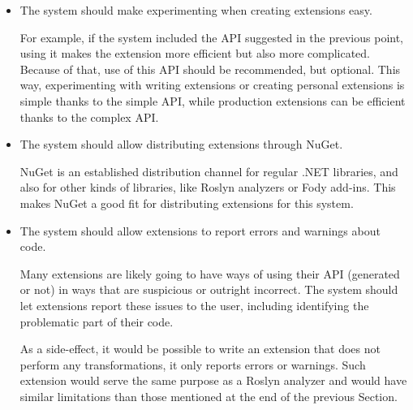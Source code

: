 \begin{itemize}
\item The system should make experimenting when creating extensions easy.

For example, if the system included the \ac{API} suggested in the previous point, using it makes the extension more efficient but also more complicated. Because of that, use of this \ac{API} should be recommended, but optional. This way, experimenting with writing extensions or creating personal extensions is simple thanks to the simple \ac{API}, while production extensions can be efficient thanks to the complex \ac{API}.

\item The system should allow distributing extensions through NuGet.

NuGet is an established distribution channel for regular .NET libraries, and also for other kinds of libraries, like Roslyn analyzers or Fody add-ins. This makes NuGet a good fit for distributing extensions for this system.

\item The system should allow extensions to report errors and warnings about code.

Many extensions are likely going to have ways of using their \ac{API} (generated or not) in ways that are suspicious or outright incorrect. The system should let extensions report these issues to the user, including identifying the problematic part of their code.

As a side-effect, it would be possible to write an extension that does not perform any transformations, it only reports errors or warnings. Such extension would serve the same purpose as a Roslyn analyzer and would have similar limitations than those mentioned at the end of the previous Section.



\end{itemize}